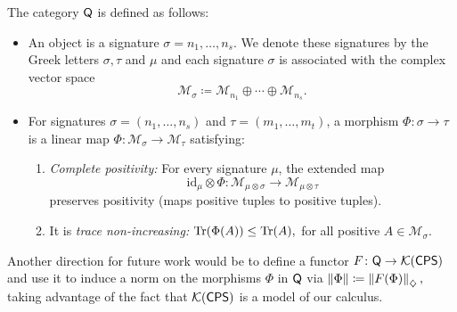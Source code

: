 \begin{definition} \label{def:catQ}
The category $\mathsf{Q}$ is defined as follows:
\begin{itemize}
  \item An object is a signature $\sigma= n_1, \ldots, n_s$. We denote these signatures by the Greek letters $\sigma, \tau$ and $\mu$ and each signature $\sigma$ is associated with the complex vector space
  \[
  \mathcal{M}_\sigma \coloneqq \mathcal{M}_{n_1} \oplus \cdots \oplus \mathcal{M}_{n_s}.
  \]
  
  \item  For signatures $\sigma = (n_1, \ldots, n_s)$ and $\tau = (m_1, \ldots, m_t)$, a morphism $\Phi: \sigma \to \tau$ is a linear map $\Phi: \mathcal{M}_\sigma \to \mathcal{M}_\tau$ satisfying:
    \begin{enumerate}
        \item \emph{Complete positivity:} For every signature $\mu$, the extended map
        \[
        \mathrm{id}_{\mu} \otimes \Phi: \mathcal{M}_{\mu \otimes \sigma} \to \mathcal{M}_{\mu \otimes \tau}
        \]
        preserves positivity (maps positive tuples to positive tuples).
        
        \item It is \emph{trace non-increasing:}
        \(
        \text{Tr}(\Phi(A)) \leq \text{Tr}(A),
        \)
        for all positive  $A \in \mathcal{M}_\sigma$.
    \end{enumerate}
\end{itemize}
\end{definition}


Another direction for future work would be to define a functor 
\( F \colon \mathsf{Q} \to \mathcal{K}(\mathsf{CPS}) \) 
and use it to induce a norm on the morphisms \(\Phi\) in \(\mathsf{Q}\) via 
\( \|\Phi\| \coloneqq \left\lVert F(\Phi) \right\rVert_{\diamondsuit}, \) 
taking advantage of the fact that \(\mathcal{K}(\mathsf{CPS})\) is a model of our calculus.

